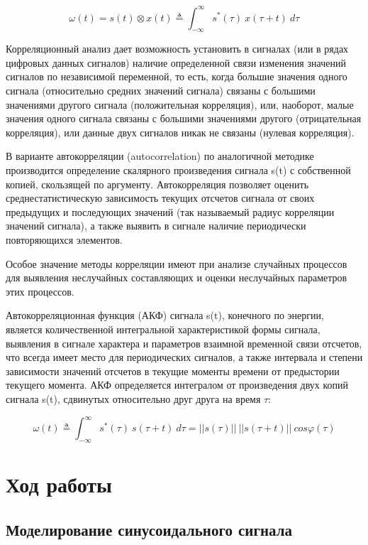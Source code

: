 \documentclass[a4paper,14pt]{extarticle}
\begin{document}
\begin{equation}
\omega(t) = s(t)\otimes x(t) \triangleq \int^{\infty}_{-\infty} s^*(\tau)\ x(\tau+t)\ d\tau
\label{cross-corr}
\end{equation}


Корреляционный анализ дает возможность установить в сигналах (или в рядах цифровых данных сигналов) наличие определенной связи изменения значений сигналов по независимой переменной, то есть, когда большие значения одного сигнала (относительно средних значений сигнала) связаны с большими значениями другого сигнала (положительная корреляция), или, наоборот, малые значения одного сигнала связаны с большими значениями другого (отрицательная корреляция), или данные двух сигналов никак не связаны (нулевая корреляция).

В варианте автокорреляции (autocorrelation) по аналогичной методике производится определение скалярного произведения сигнала s(t) с собственной копией, скользящей по аргументу. Автокорреляция позволяет оценить среднестатистическую зависимость текущих отсчетов сигнала от своих предыдущих и последующих значений (так называемый радиус корреляции значений сигнала), а также выявить в сигнале наличие периодически повторяющихся элементов.

Особое значение методы корреляции имеют при анализе случайных процессов для выявления неслучайных составляющих и оценки неслучайных параметров этих процессов.

Автокорреляционная функция (АКФ) сигнала s(t), конечного по энергии, является количественной интегральной характеристикой формы сигнала, выявления в сигнале характера и параметров взаимной временной связи отсчетов, что всегда имеет место для периодических сигналов, а также интервала и степени зависимости значений отсчетов в текущие моменты времени от предыстории текущего момента. АКФ определяется интегралом от произведения двух копий сигнала s(t), сдвинутых относительно друг друга на время $\tau$:

\begin{equation}
\omega(t) \triangleq \int^{\infty}_{-\infty} s^*(\tau)\ s(\tau+t)\ d\tau = ||s(\tau)|| \ ||s(\tau+t)|| \ cos \varphi(\tau)
\end{equation}

\section{Ход работы}

\subsection{Моделирование синусоидального сигнала}
\end{document}

